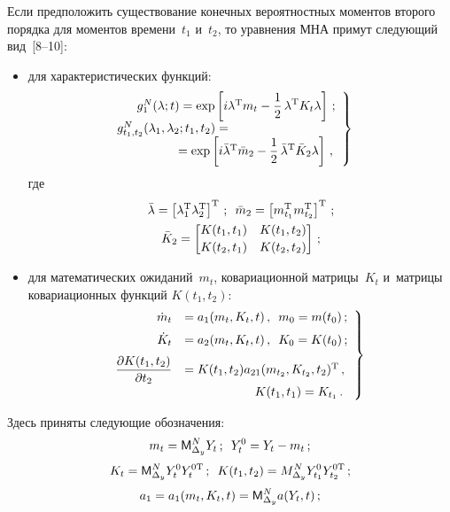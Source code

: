 \begin{multicols}{2}
Если предположить существование конечных вероятностных моментов второго 
порядка для моментов времени~$t_1$ и~$t_2$, то уравнения МНА примут следующий 
вид~[8--10]:
\begin{itemize}
\item  для характеристических функций:
    \begin{equation}
    \left.
    \begin{array}{c}
    g_1^N (\la;t) =\exp \lk i\la^{\mathrm{T}} m_t - \fr{1}{2}\, \la^{\mathrm{T}} K_t \la\rk\,;\\[6pt]
   \hspace*{-35mm}g_{t_1, t_2}^N (\la_1, \la_2;t_1, t_2 ) ={}\\
    \hspace*{10mm}{}=\exp \lk i\bar \la^{\mathrm{T}} \bar m_2 - 
    \fr{1}{2} \,\bar \la^{\mathrm{T}} \bar K_2 \la\rk\,,
    \end{array}
    \right\}
    \label{e23-sin}
    \end{equation}
    где
\begin{gather*}
\bar {\lambda} =\left[ \lambda_1^{\mathrm{T}}\lambda_2^{\mathrm{T}}\right]^{\mathrm{T}}\,; \enskip
\bar m_2 = \left[ m_{t_1}^{\mathrm{T}} m_{t_2}^{\mathrm{T}}\right]^{\mathrm{T}}\,;\\ 
\bar K_2= \begin{bmatrix}
    K(t_1, t_1)& K(t_1, t_2)\\[2pt]
    K(t_2, t_1)& K(t_2, t_2)\end{bmatrix}\,;
    \end{gather*}

\item для математических ожиданий~$m_t$, ковариационной матрицы~$K_t$ 
и~матрицы ковариационных функций $K(t_1, t_2)$:
 \begin{equation}
 \left.
 \hspace*{-3mm}\begin{array}{rl}
 \dot m_t &= a_1 (m_t, K_t, t)\,,\enskip m_0 = m(t_0)\,;\\[6pt]
\dot K_t &= a_2 (m_t, K_t, t)\,,\enskip K_0 = K(t_0)\,;\\[6pt]
\fr{\prt K(t_1, t_2)}{\prt t_2 }&= K(t_1, t_2) a_{21} (m_{t_2}, K_{t_2}, t_2)^{\mathrm{T}}\,,
\\[6pt]
 &\hspace*{20mm}K(t_1, t_1) = K_{t_1}\,.
 \end{array}
 \right\}\!
\label{e24-sin}
\end{equation}
    \end{itemize}
Здесь приняты следующие обозначения:
    $$
    m_t = {\sf M}_{\Delta_y}^N Y_t\,;\enskip Y_t^0 = Y_t - m_t\,;
    $$
    $$
    K_t = {\sf M}_{\Delta_y}^N Y_t^0 Y_t^{\mathrm{0T}}\,;\enskip K(t_1, t_2) = 
    M_{\Delta_y}^N Y_{t_1}^{0} Y_{t_2}^{\mathrm{0T}}\,;
    $$
    $$
    a_1 = a_1 (m_t, K_t, t) = {\sf M}_{\Delta_y}^N a (Y_t, t)\,;
    $$
    

\end{multicols}

